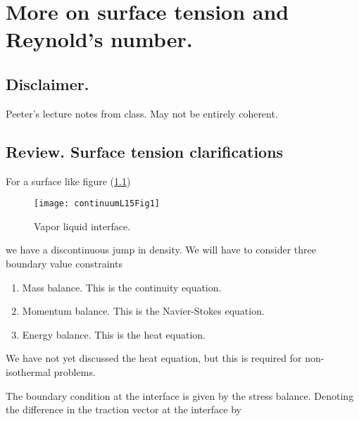 %
%

\chapter{More on surface tension and Reynold's number.}
\label{chap:continuumL15}
{}
\date{Mar 9, 2012}

\beginArtWithToc

\section{Disclaimer.}

Peeter's lecture notes from class.  May not be entirely coherent.

\section{Review.  Surface tension clarifications}

For a surface like figure (\ref{fig:continuumL15:continuumL15Fig1})
\begin{figure}[htp]
   \centering
   \texttt{[image: continuumL15Fig1]}
   \caption{Vapor liquid interface.}\label{fig:continuumL15:continuumL15Fig1}
\end{figure}

we have a discontinuous jump in density.  We will have to consider three boundary value constraints

\begin{enumerate}
\item Mass balance.  This is the continuity equation.
\item Momentum balance.  This is the Navier-Stokes equation.
\item Energy balance.  This is the heat equation.
\end{enumerate}

We have not yet discussed the heat equation, but this is required for non-isothermal problems.

The boundary condition at the interface is given by the stress balance.  Denoting the difference in the traction vector at the interface by

